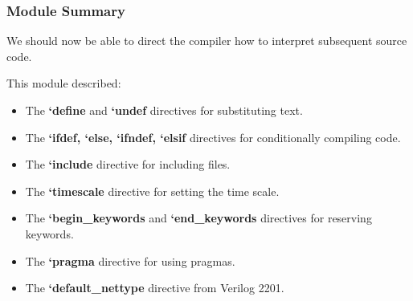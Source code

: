 \documentclass[t, notes, xcolor=table]{beamer}
\begin{document}
\begin{frame}
\frametitle{Module Summary}
We should now be able to direct the compiler how to interpret subsequent source code.
\newline

This module described:
\scriptsize{
\begin{itemize}
\item The \textbf{`define} and \textbf{`undef} directives for substituting text.
\item The \textbf{`ifdef, `else, `ifndef, `elsif} directives for conditionally compiling code.
\item The \textbf{`include} directive for including files.
\item The \textbf{`timescale} directive for setting the time scale.
\item The \textbf{`begin\_keywords} and \textbf{`end\_keywords} directives for reserving keywords.
\item The \textbf{`pragma} directive for using pragmas.
\item The \textbf{`default\_nettype} directive from Verilog 2201.
\end{itemize}
}
\end{frame}
\end{document}
